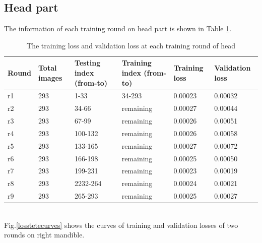 \documentclass[12pt,a4paper]{article}
\begin{document}
\subsection{Head part}
The information of each training round on head part is shown in Table \ref{headloss}.
\begin{table}[h!]
	\centering
	\begin{tabular}{l p{2cm} p{2.4cm} p{2.6cm} p{2.2cm} p{2.2cm}}
	Round & Total images & Testing index (from-to) & Training index (from-to) & Training loss & Validation loss \\ \hline
	r1 & 293 & 1-33 & 34-293 & 0.00023 & 0.00032 \\ \hline
	r2 & 293 & 34-66 & remaining & 0.00027 & 0.00044 \\ \hline
	r3 & 293 & 67-99 & remaining & 0.00026 & 0.00051 \\ \hline
	r4 & 293 & 100-132 & remaining & 0.00026 & 0.00058 \\ \hline
	r5 & 293 & 133-165 & remaining & 0.00027 & 0.00072 \\ \hline
	r6 & 293 & 166-198 & remaining & 0.00025 & 0.00050 \\ \hline
	r7 & 293 & 199-231 & remaining & 0.00023 & 0.00019 \\ \hline
	r8 & 293 & 2232-264 & remaining & 0.00024 & 0.00021 \\ \hline
	r9 & 293 & 265-293 & remaining & 0.00025 & 0.00027 \\ \hline	
	\end{tabular}
	\caption{The training loss and validation loss at each training round of head}
	\label{headloss}
\end{table}~\\
Fig.\ref{losstetecurves} shows the curves of training and validation losses of two rounds on right mandible.\\[0.1cm]
\end{document}
